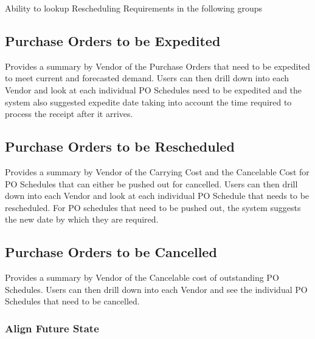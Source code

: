\documentclass[letterpaper,10pt,english]{sphinxmanual}
\begin{document}
Ability to lookup Rescheduling Requirements in the following groups


\subsection{Purchase Orders to be Expedited}
\label{\detokenize{index:purchase-orders-to-be-expedited}}
Provides a summary by Vendor of the Purchase Orders that need to be
expedited to meet current and forecasted demand. Users can then drill
down into each Vendor and look at each individual PO Schedules need to
be expedited and the system also suggested expedite date taking into
account the time required to process the receipt after it arrives.


\subsection{Purchase Orders to be Rescheduled}
\label{\detokenize{index:purchase-orders-to-be-rescheduled}}
Provides a summary by Vendor of the Carrying Cost and the Cancelable
Cost for PO Schedules that can either be pushed out for cancelled. Users
can then drill down into each Vendor and look at each individual PO
Schedule that needs to be rescheduled. For PO schedules that need to be
pushed out, the system suggests the new date by which they are required.


\subsection{Purchase Orders to be Cancelled}
\label{\detokenize{index:purchase-orders-to-be-cancelled}}
Provides a summary by Vendor of the Cancelable cost of outstanding PO
Schedules. Users can then drill down into each Vendor and see the
individual PO Schedules that need to be cancelled.


\subsubsection{Align Future State}
\label{\detokenize{FutureState:align-future-state}}\label{\detokenize{FutureState::doc}}
\end{document}
